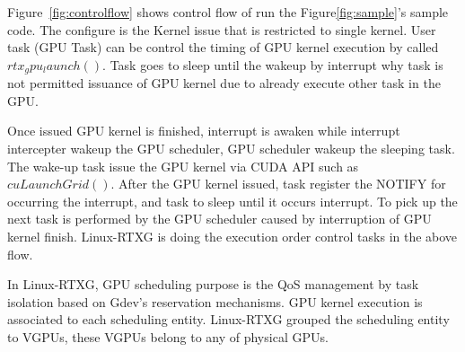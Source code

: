 Figure~\ref{fig:controlflow} shows control flow of run the Figure\ref{fig:sample}'s sample code.
The configure is the Kernel issue that is restricted to single kernel.
User task (GPU Task) can be control the timing of GPU kernel execution by called $rtx_gpu_launch()$.
Task goes to sleep until the wakeup by interrupt why task is not permitted issuance of GPU kernel due to already execute other task in the GPU.

Once issued GPU kernel is finished,
interrupt is awaken while interrupt intercepter wakeup the GPU scheduler, GPU scheduler wakeup the sleeping task. 
The wake-up task issue the GPU kernel via CUDA API such as $cuLaunchGrid()$.
After the GPU kernel issued, task register the NOTIFY for occurring the interrupt,
and task to sleep until it occurs interrupt.
To pick up the next task is performed by the GPU scheduler caused by interruption of GPU kernel finish.
Linux-RTXG is doing the execution order control tasks in the above flow.

In Linux-RTXG, GPU scheduling purpose is the QoS management by task isolation based on Gdev's reservation mechanisms.
GPU kernel execution is associated to each scheduling entity.
Linux-RTXG grouped the scheduling entity to VGPUs, these VGPUs belong to any of physical GPUs.

